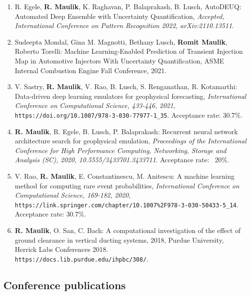 \documentclass[letterpaper]{article}
\begin{document}
\begin{enumerate}

\item R. Egele, \textbf{R. Maulik}, K. Raghavan, P. Balaprakash, B. Lusch, AutoDEUQ: Automated Deep Ensemble with Uncertainty Quantification, {\it Accepted, International Conference on Pattern Recognition 2022, arXiv:2110.13511}.

\item Sudeepta Mondal, Gina M. Magnotti, Bethany Lusch, \textbf{Romit Maulik}, Roberto Torelli: Machine Learning-Enabled Prediction of Transient Injection Map in Automotive Injectors With Uncertainty Quantification, ASME Internal Combustion Engine Fall Conference, 2021. 

\item V. Sastry, \textbf{R. Maulik}, V. Rao, B. Lusch, S. Renganathan, R. Kotamarthi: Data-driven deep learning emulators for geophysical forecasting, {\it International Conference on Computational Science, 433-446, 2021}, \\ \texttt{https://doi.org/10.1007/978-3-030-77977-1\_35}. Acceptance rate: 30.7\%.

\item \textbf{R. Maulik}, R. Egele, B. Lusch,  P. Balaprakash: Recurrent neural network architecture search for geophysical emulation, {\it Proceedings of the International Conference for High Performance Computing, Networking, Storage and Analysis (SC), 2020, 10.5555/3433701.3433711}. Acceptance rate: ~20\%.

\item V. Rao, \textbf{R. Maulik}, E. Constantinescu, M. Anitescu: A machine learning method for computing rare event probabilities, {\it International Conference on Computational Science, 169-182, 2020}, \\ \texttt{https://link.springer.com/chapter/10.1007\%2F978-3-030-50433-5\_14}. Acceptance rate: 30.7\%.

\item \textbf{R. Maulik}, O. San, C. Bach: A computational investigation of the effect of ground clearance in vertical ducting systems, 2018, Purdue University, Herrick Labs Conferences 2018. \\ \texttt{https://docs.lib.purdue.edu/ihpbc/308/}.

\end{enumerate}

\subsection*{Conference publications}
\end{document}
